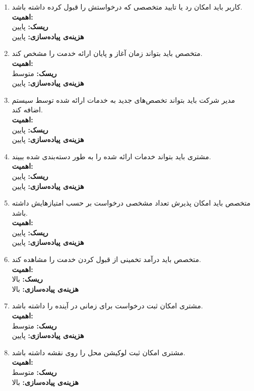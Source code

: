 \begin{enumerate}
	\item
	کاربر باید امکان رد یا تایید متخصصی که درخواستش را قبول کرده داشته باشد.
	\\
	\textbf{اهمیت:} 
	\\
	\textbf{ریسک:} پایین
	\\
	\textbf{هزینه‌ی پیاده‌سازی:} پایین
	
		\item
	متخصص باید بتواند زمان آغاز و پایان ارائه خدمت را مشخص کند.
	\\
	\textbf{اهمیت:} 
	\\
	\textbf{ریسک:} متوسط
	\\
	\textbf{هزینه‌ی پیاده‌سازی:} پایین
	
	
			\item
مدیر شرکت باید بتواند تخصص‌‌های جدید به خدمات ارائه شده توسط سیستم اضافه کند.
	\\
	\textbf{اهمیت:} 
	\\
	\textbf{ریسک:} پایین
	\\
	\textbf{هزینه‌ی پیاده‌سازی:} پایین
	
				\item
مشتری باید بتواند خدمات ارائه شده را به طور دسته‌بندی شده ببیند.
	\\
	\textbf{اهمیت:} 
	\\
	\textbf{ریسک:} پایین
	\\
	\textbf{هزینه‌ی پیاده‌سازی:} پایین
	
	\item
	متخصص باید امکان پذیرش تعداد مشخصی درخواست بر حسب امتیازهایش داشته باشد.
	\\
	\textbf{اهمیت:} 
	\\
	\textbf{ریسک:} پایین
	\\
	\textbf{هزینه‌ی پیاده‌سازی:} پایین
	
		\item
	متخصص باید درآمد تخمینی از قبول کردن خدمت را مشاهده کند.
	\\
	\textbf{اهمیت:} 
	\\
	\textbf{ریسک:} بالا
	\\
	\textbf{هزینه‌ی پیاده‌سازی:} بالا
	
		\item
	مشتری امکان ثبت درخواست برای زمانی در آینده را داشته باشد.
	\\
	\textbf{اهمیت:} 
	\\
	\textbf{ریسک:} متوسط
	\\
	\textbf{هزینه‌ی پیاده‌سازی:} پایین
			\item
	مشتری امکان ثبت لوکیشن محل را روی نقشه داشته باشد.
	\\
	\textbf{اهمیت:} 
	\\
	\textbf{ریسک:} متوسط
	\\
	\textbf{هزینه‌ی پیاده‌سازی:} بالا
	

\end{enumerate}
